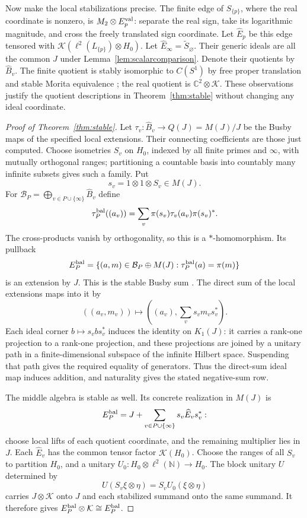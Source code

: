 \documentclass[11pt]{article}
\newcommand{\C}{\mathbb C}
\newcommand{\N}{\mathbb N}
\newcommand{\K}{\mathcal K}
\theoremstyle{definition}
\theoremstyle{remark}
\begin{document}
Now make the local stabilizations precise. The finite edge of $S_{\{p\}}$, where the real coordinate is nonzero, is $M_2\otimes E_p^{\rm val}$: separate the real sign, take its logarithmic magnitude, and cross the freely translated sign coordinate. Let $\widehat E_p$ be this edge tensored with $\K(\ell^2(L_{\{p\}})\otimes H_0)$. Let $\widehat E_\infty=\widetilde S_\varnothing$. Their generic ideals are all the common $J$ under Lemma~\ref{lem:scalarcomparison}. Denote their quotients by $\widehat B_v$. The finite quotient is stably isomorphic to $C(S^1)$ by free proper translation and stable Morita equivalence \citep[Theorems 1.1--1.2, pp.~350--352]{BGR}; the real quotient is $\C^2\otimes\K$. These observations justify the quotient descriptions in Theorem~\ref{thm:stable} without changing any ideal coordinate.

\begin{proof}[Proof of Theorem~\ref{thm:stable}]
Let $\tau_v:\widehat B_v\to Q(J)=M(J)/J$ be the Busby maps of the specified local extensions. Their connecting coefficients are those just computed. Choose isometries $S_v$ on $H_0$, indexed by all finite primes and $\infty$, with mutually orthogonal ranges; partitioning a countable basis into countably many infinite subsets gives such a family. Put
\[
 s_v=1\otimes1\otimes S_v\in M(J).
\]
For $\mathcal B_P=\bigoplus_{v\in P\cup\{\infty\}}\widehat B_v$ define
\[
 \tau_P^{\rm bal}((a_v))=
 \sum_v\pi(s_v)\tau_v(a_v)\pi(s_v)^*.
\]
The cross-products vanish by orthogonality, so this is a $*$-homomorphism. Its pullback
\[
 E_P^{\rm bal}=
 \{(a,m)\in \mathcal B_P\oplus M(J):\tau_P^{\rm bal}(a)=\pi(m)\}
\]
is an extension by $J$. This is the stable Busby sum \citep[\S\S15.3, 15.6]{Blackadar}. The direct sum of the local extensions maps into it by
\[
 ((a_v,m_v))\longmapsto
 \left((a_v),\sum_vs_vm_vs_v^*\right).
\]
Each ideal corner $b\mapsto s_vbs_v^*$ induces the identity on $K_1(J)$: it carries a rank-one projection to a rank-one projection, and these projections are joined by a unitary path in a finite-dimensional subspace of the infinite Hilbert space. Suspending that path gives the required equality of generators. Thus the direct-sum ideal map induces addition, and naturality gives the stated negative-sum row.

The middle algebra is stable as well. Its concrete realization in $M(J)$ is
\[
 E_P^{\rm bal}=J+\sum_{v\in P\cup\{\infty\}}s_v\widehat E_vs_v^*:
\]
choose local lifts of each quotient coordinate, and the remaining multiplier lies in $J$. Each $\widehat E_v$ has the common tensor factor $\K(H_0)$. Choose the ranges of all $S_v$ to partition $H_0$, and a unitary $U_0:H_0\otimes\ell^2(\N)\to H_0$. The block unitary $U$ determined by
\[
 U(S_v\xi\otimes\eta)=S_vU_0(\xi\otimes\eta)
\]
carries $J\otimes\K$ onto $J$ and each stabilized summand onto the same summand. It therefore gives $E_P^{\rm bal}\otimes\K\cong E_P^{\rm bal}$.


\end{proof}
\end{document}
